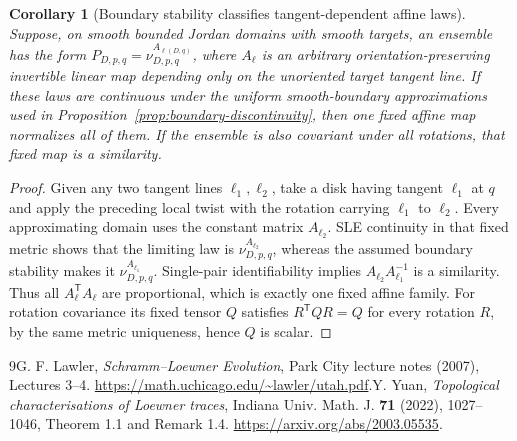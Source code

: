 \documentclass[11pt]{article}
\newtheorem{corollary}[theorem]{Corollary}
\theoremstyle{definition}\newtheorem{definition}[theorem]{Definition}
\theoremstyle{remark}\newtheorem{remark}[theorem]{Remark}
\newcommand{\nuA}[4]{\nu^{#1}_{#2,#3,#4}}
\begin{document}
\begin{corollary}[Boundary stability classifies tangent-dependent affine laws]
\label{cor:tangent-stability}
Suppose, on smooth bounded Jordan domains with smooth targets, an ensemble
has the form $P_{D,p,q}=\nuA{A_{\ell(D,q)}}{D}{p}{q}$, where $A_\ell$
is an arbitrary orientation-preserving invertible linear map depending
only on the unoriented target tangent line. If these laws are continuous
under the uniform smooth-boundary approximations used in
Proposition~\ref{prop:boundary-discontinuity}, then one fixed affine
map normalizes all of them. If the ensemble is also covariant under
all rotations, that fixed map is a similarity.
\end{corollary}
\begin{proof}
Given any two tangent lines $\ell_1,\ell_2$, take a disk having tangent
$\ell_1$ at $q$ and apply the preceding local twist with the rotation
carrying $\ell_1$ to $\ell_2$. Every approximating domain uses the
constant matrix $A_{\ell_2}$. SLE continuity in that fixed metric shows
that the limiting law is $\nuA{A_{\ell_2}}{D}{p}{q}$, whereas the assumed
boundary stability makes it $\nuA{A_{\ell_1}}{D}{p}{q}$. Single-pair
identifiability implies $A_{\ell_2}A_{\ell_1}^{-1}$ is a similarity.
Thus all $A_\ell^{\mathsf T}A_\ell$ are proportional, which is exactly
one fixed affine family. For rotation covariance its fixed tensor $Q$
satisfies $R^{\mathsf T}QR=Q$ for every rotation $R$, by the same metric
uniqueness, hence $Q$ is scalar.
\end{proof}

\begin{thebibliography}{9}G. F. Lawler, \emph{Schramm--Loewner Evolution}, Park City lecture notes (2007), Lectures 3--4. \url{https://math.uchicago.edu/~lawler/utah.pdf}.Y. Yuan, \emph{Topological characterisations of Loewner traces}, Indiana Univ. Math. J. \textbf{71} (2022), 1027--1046, Theorem 1.1 and Remark 1.4. \url{https://arxiv.org/abs/2003.05535}.\end{thebibliography}
\end{document}
